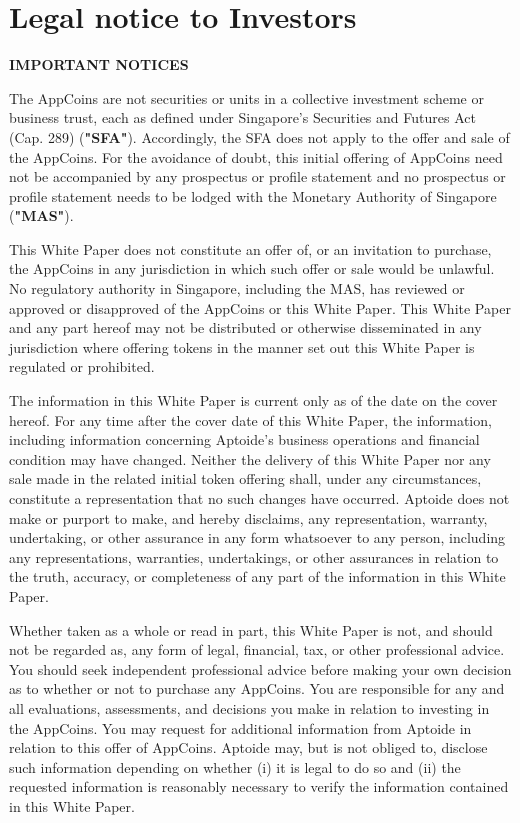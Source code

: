 \section*{Legal notice to Investors}

\textbf{IMPORTANT NOTICES}

\medskip

The AppCoins are not securities or units in a collective investment scheme or business trust, each as defined under Singapore's Securities and Futures Act (Cap. 289) (\textbf{"SFA"}). Accordingly, the SFA does not apply to the offer and sale of the AppCoins. For the avoidance of doubt, this initial offering of AppCoins need not be accompanied by any prospectus or profile statement and no prospectus or profile statement needs to be lodged with the Monetary Authority of Singapore (\textbf{"MAS"}).

\medskip

This White Paper does not constitute an offer of, or an invitation to purchase, the AppCoins in any jurisdiction in which such offer or sale would be unlawful. No regulatory authority in Singapore, including the MAS, has reviewed or approved or disapproved of the AppCoins or this White Paper. This White Paper and any part hereof may not be distributed or otherwise disseminated in any jurisdiction where offering tokens in the manner set out this White Paper is regulated or prohibited.

\medskip

The information in this White Paper is current only as of the date on the cover hereof. For any time after the cover date of this White Paper, the information, including information concerning Aptoide's business operations and financial condition may have changed. Neither the delivery of this White Paper nor any sale made in the related initial token offering shall, under any circumstances, constitute a representation that no such changes have occurred. Aptoide does not make or purport to make, and hereby disclaims, any representation, warranty, undertaking, or other assurance in any form whatsoever to any person, including any representations, warranties, undertakings, or other assurances in relation to the truth, accuracy, or completeness of any part of the information in this White Paper.

\medskip

Whether taken as a whole or read in part, this White Paper is not, and should not be regarded as, any form of legal, financial, tax, or other professional advice. You should seek independent professional advice before making your own decision as to whether or not to purchase any AppCoins. You are responsible for any and all evaluations, assessments, and decisions you make in relation to investing in the AppCoins. You may request for additional information from Aptoide in relation to this offer of AppCoins. Aptoide may, but is not obliged to, disclose such information depending on whether (i) it is legal to do so and (ii) the requested information is reasonably necessary to verify the information contained in this White Paper.

